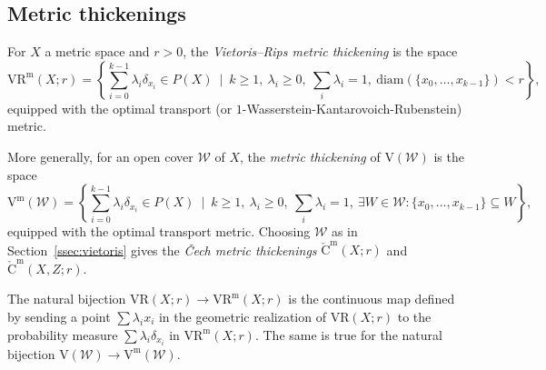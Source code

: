 \documentclass[11pt, reqno, english]{amsart}
\theoremstyle{plain}
\theoremstyle{definition}
\theoremstyle{myremark}
\newcommand{\cW}{\mathcal{W}}
\newcommand{\diam}{\mathrm{diam}}
\newcommand{\vr}[2]{\mathrm{VR}(#1;#2)}
\newcommand{\viet}[1]{\mathrm{V}(#1)}
\newcommand{\vietm}[1]{\mathrm{V}^\mathrm{m}(#1)}
\newcommand{\vrm}[2]{\mathrm{VR}^\mathrm{m}(#1;#2)}
\newcommand{\cechm}[2]{\mathrm{\check{C}}^\mathrm{m}(#1;#2)}
\newcommand{\acechm}[3]{\mathrm{\check{C}}^\mathrm{m}(#1,#2;#3)}
\begin{document}


\subsection{Metric thickenings}

For $X$ a metric space and $r>0$, the \emph{Vietoris--Rips metric thickening} is the space
\[\vrm{X}{r}=\left\{\sum_{i=0}^{k-1}\lambda_i\delta_{x_i}\in P(X)~\mid~k\ge 1,\ \lambda_i\ge 0,\ \sum_i\lambda_i=1,\ \diam(\{x_0,\ldots,x_{k-1}\})<r\right\},\]
equipped with the optimal transport (or $1$-Wasserstein-Kantarovoich-Rubenstein) metric.

More generally, for an open cover $\cW$ of $X$, the \emph{metric thickening} of $\viet{\cW}$ is the space
\[
\vietm{\cW}=\left\{\sum_{i=0}^{k-1}\lambda_i\delta_{x_i}\in P(X)~\mid~k\ge 1,\ \lambda_i\ge 0,\ \sum_i\lambda_i=1,\ \exists W \in \cW: \{x_0,\ldots,x_{k-1}\} \subseteq W \right\},
\]
equipped with the optimal transport metric.
Choosing $\cW$ as in Section~\ref{ssec:vietoris} gives the \emph{\v{C}ech metric thickenings} $\cechm{X}{r}$ and $\acechm{X}{Z}{r}$.

The natural bijection $\vr{X}{r}\to \vrm{X}{r}$ is the continuous map defined by sending a point $\sum \lambda_i x_i$ in the geometric realization of $\vr{X}{r}$ to the probability measure $\sum \lambda_i\delta_{x_i}$ in $\vrm{X}{r}$.
The same is true for the natural bijection $\viet{\cW}\to \vietm{\cW}$.
\end{document}
